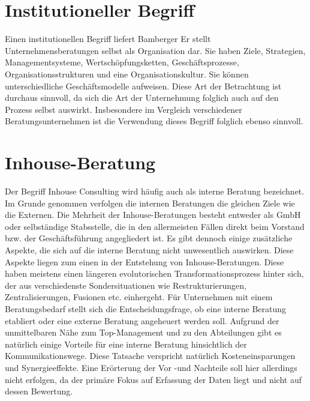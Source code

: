 \section{Institutioneller Begriff}

Einen institutionellen Begriff liefert Bamberger \cite[16]{bamberg2008strategische}
Er stellt Unternehmensberatungen selbst als Organisation dar. Sie haben Ziele, Strategien, Managementsysteme, Wertschöpfungsketten, Geschäftsprozesse, Organisationsstrukturen und eine Organisationskultur. Sie können unterschiedliche Geschäftsmodelle aufweisen. Diese Art der Betrachtung ist durchaus sinnvoll, da sich die Art der Unternehmung folglich auch auf den Prozess selbst auswirkt. Insbesondere im Vergleich verschiedener Beratungsunternehmen ist die Verwendung dieses Begriff folglich ebenso sinnvoll.

\section{Inhouse-Beratung}
Der Begriff Inhouse Consulting wird häufig auch als interne Beratung bezeichnet. \cite[150]{ReinekeBock200709}
Im Grunde genommen verfolgen die internen Beratungen die gleichen Ziele wie die Externen. Die Mehrheit der Inhouse-Beratungen besteht entweder als GmbH oder selbständige Stabsstelle, die in den allermeisten Fällen direkt beim Vorstand bzw. der Geschäftsführung angegliedert ist. \cite[14]{B2_InhouseConsulting}
Es gibt dennoch einige zusätzliche Aspekte, die sich auf die interne Beratung nicht unwesentlich auswirken. Diese Aspekte liegen zum einen in der Entstehung von Inhouse-Beratungen. Diese haben meistens einen längeren evolutorischen Transformationsprozess hinter sich, der aus verschiedenste Sondersituationen wie Restrukturierungen, Zentralisierungen, Fusionen etc. einhergeht. \cite[160]{Lippold201309}
Für Unternehmen mit einem Beratungsbedarf stellt sich die Entscheidungsfrage, ob eine interne Beratung etabliert oder eine externe Beratung angeheuert werden soll.
Aufgrund der unmittelbaren Nähe zum Top-Management und zu den Abteilungen gibt es natürlich einige Vorteile für eine interne Beratung hinsichtlich der Kommunikationswege.
Diese Tatsache verspricht natürlich Kosteneinsparungen und Synergieeffekte. Eine Erörterung der Vor -und Nachteile soll hier allerdings nicht erfolgen, da der primäre Fokus auf Erfassung der Daten liegt und nicht auf dessen Bewertung.

